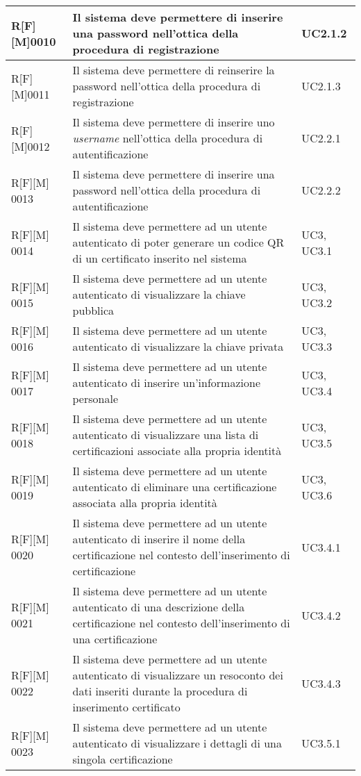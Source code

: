 \begin{center}
\begin{longtable}{|p{2cm}|p{9cm}|p{2cm}|}
\hline
R[F][M]0010    & Il sistema deve permettere di inserire una password nell’ottica della procedura di registrazione & UC2.1.2 \\
\hline
R[F][M]0011     & Il sistema deve permettere di reinserire la password nell’ottica della procedura di registrazione & UC2.1.3 \\
\hline
R[F][M]0012     & Il sistema deve permettere di inserire uno \textit{username} nell’ottica della procedura di autentificazione & UC2.2.1 \\
\hline
R[F][M] 0013     & Il sistema deve permettere di inserire una password nell’ottica della procedura di autentificazione & UC2.2.2 \\
\hline
R[F][M] 0014     & Il sistema deve permettere ad un utente autenticato di poter generare un codice QR di un certificato inserito nel sistema & UC3, UC3.1 \\
\hline
R[F][M] 0015     & Il sistema deve permettere ad un utente autenticato di visualizzare la chiave pubblica & UC3, UC3.2 \\
\hline
R[F][M] 0016     & Il sistema deve permettere ad un utente autenticato di visualizzare la chiave privata & UC3, UC3.3 \\
\hline
R[F][M] 0017     & Il sistema deve permettere ad un utente autenticato di inserire un’informazione personale & UC3, UC3.4 \\
\hline
R[F][M] 0018     & Il sistema deve permettere ad un utente autenticato di visualizzare una lista di certificazioni associate alla propria identità & UC3, UC3.5 \\
\hline
R[F][M] 0019     & Il sistema deve permettere ad un utente autenticato di eliminare una certificazione associata alla propria identità & UC3, UC3.6 \\
\hline
R[F][M] 0020     & Il sistema deve permettere ad un utente autenticato di inserire il nome della certificazione nel contesto dell’inserimento di certificazione & UC3.4.1 \\
\hline
R[F][M] 0021     & Il sistema deve permettere ad un utente autenticato di una descrizione della certificazione nel contesto dell’inserimento di una certificazione & UC3.4.2 \\
\hline
R[F][M] 0022     & Il sistema deve permettere ad un utente autenticato di visualizzare un resoconto dei dati inseriti durante la procedura di inserimento certificato & UC3.4.3 \\
\hline
R[F][M] 0023     & Il sistema deve permettere ad un utente autenticato di visualizzare i dettagli di una singola certificazione & UC3.5.1 \\

\end{longtable}
\end{center}
